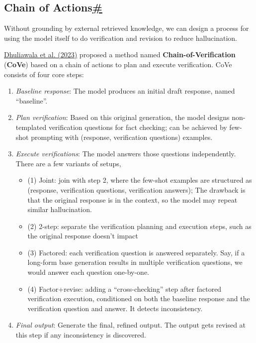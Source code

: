 \subsection{\texorpdfstring{Chain of Actions\hyperref[chain-of-actions]{\#}}{Chain of Actions\#}}\label{chain-of-actions}

Without grounding by external retrieved knowledge, we can design a process for using the model itself to do verification and revision to reduce hallucination.

\href{https://arxiv.org/abs/2309.11495}{Dhuliawala et al. (2023)} proposed a method named \textbf{Chain-of-Verification} (\textbf{CoVe}) based on a chain of actions to plan and execute verification. CoVe consists of four core steps:

\begin{enumerate}
\tightlist
\item
  \emph{Baseline response}: The model produces an initial draft response, named ``baseline''.
\item
  \emph{Plan verification}: Based on this original generation, the model designs non-templated verification questions for fact checking; can be achieved by few-shot prompting with (response, verification questions) examples.
\item
  \emph{Execute verifications}: The model answers those questions independently. There are a few variants of setups,

  \begin{itemize}
  \tightlist
  \item
    (1) Joint: join with step 2, where the few-shot examples are structured as (response, verification questions, verification answers); The drawback is that the original response is in the context, so the model may repeat similar hallucination.
  \item
    (2) 2-step: separate the verification planning and execution steps, such as the original response doesn't impact
  \item
    (3) Factored: each verification question is answered separately. Say, if a long-form base generation results in multiple verification questions, we would answer each question one-by-one.
  \item
    (4) Factor+revise: adding a ``cross-checking'' step after factored verification execution, conditioned on both the baseline response and the verification question and answer. It detects inconsistency.
  \end{itemize}
\item
  \emph{Final output}: Generate the final, refined output. The output gets revised at this step if any inconsistency is discovered.
\end{enumerate}

